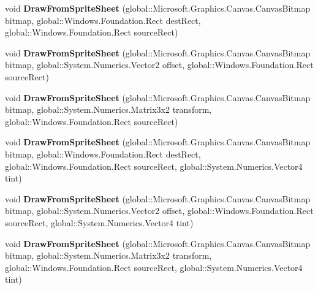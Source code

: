 \begin{DoxyCompactItemize}
void {\bfseries Draw\+From\+Sprite\+Sheet} (global\+::\+Microsoft.\+Graphics.\+Canvas.\+Canvas\+Bitmap bitmap, global\+::\+Windows.\+Foundation.\+Rect dest\+Rect, global\+::\+Windows.\+Foundation.\+Rect source\+Rect)
\item 
\mbox{\label{interface_microsoft_1_1_graphics_1_1_canvas_1_1_i_canvas_sprite_batch_af0f7c640338b4036dade8bebfe7d6efe}} 
void {\bfseries Draw\+From\+Sprite\+Sheet} (global\+::\+Microsoft.\+Graphics.\+Canvas.\+Canvas\+Bitmap bitmap, global\+::\+System.\+Numerics.\+Vector2 offset, global\+::\+Windows.\+Foundation.\+Rect source\+Rect)
\item 
\mbox{\label{interface_microsoft_1_1_graphics_1_1_canvas_1_1_i_canvas_sprite_batch_aed698fc040f38b63a71e4d1e7ea21837}} 
void {\bfseries Draw\+From\+Sprite\+Sheet} (global\+::\+Microsoft.\+Graphics.\+Canvas.\+Canvas\+Bitmap bitmap, global\+::\+System.\+Numerics.\+Matrix3x2 transform, global\+::\+Windows.\+Foundation.\+Rect source\+Rect)
\item 
\mbox{\label{interface_microsoft_1_1_graphics_1_1_canvas_1_1_i_canvas_sprite_batch_a176d58742b3a6407e8ff6d87566b932c}} 
void {\bfseries Draw\+From\+Sprite\+Sheet} (global\+::\+Microsoft.\+Graphics.\+Canvas.\+Canvas\+Bitmap bitmap, global\+::\+Windows.\+Foundation.\+Rect dest\+Rect, global\+::\+Windows.\+Foundation.\+Rect source\+Rect, global\+::\+System.\+Numerics.\+Vector4 tint)
\item 
\mbox{\label{interface_microsoft_1_1_graphics_1_1_canvas_1_1_i_canvas_sprite_batch_ac5ad0e2a3c2389b604549e6cb6590f9b}} 
void {\bfseries Draw\+From\+Sprite\+Sheet} (global\+::\+Microsoft.\+Graphics.\+Canvas.\+Canvas\+Bitmap bitmap, global\+::\+System.\+Numerics.\+Vector2 offset, global\+::\+Windows.\+Foundation.\+Rect source\+Rect, global\+::\+System.\+Numerics.\+Vector4 tint)
\item 
\mbox{\label{interface_microsoft_1_1_graphics_1_1_canvas_1_1_i_canvas_sprite_batch_a0c004051ad173e551e71d36d94ffd928}} 
void {\bfseries Draw\+From\+Sprite\+Sheet} (global\+::\+Microsoft.\+Graphics.\+Canvas.\+Canvas\+Bitmap bitmap, global\+::\+System.\+Numerics.\+Matrix3x2 transform, global\+::\+Windows.\+Foundation.\+Rect source\+Rect, global\+::\+System.\+Numerics.\+Vector4 tint)

\end{DoxyCompactItemize}
